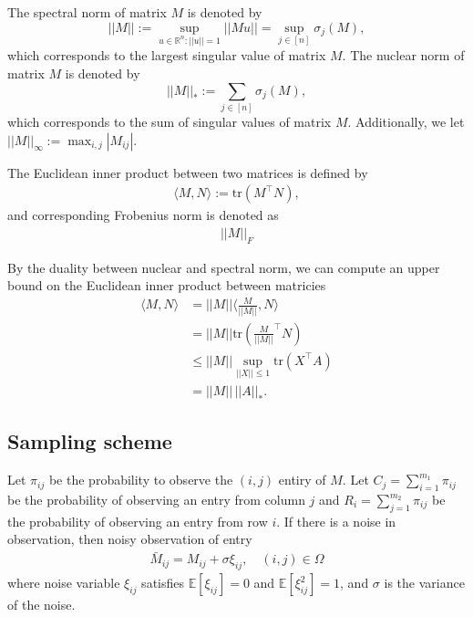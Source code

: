 \documentclass{article} %
\begin{document}
The spectral norm of matrix $M$ is denoted by
\begin{equation}
||M|| := \sup_{u\in \mathbb{R}^n:||u||=1}||Mu|| = \sup_{j\in[n]}\sigma_j(M),
\end{equation}
which corresponds to the largest singular value of matrix $M$. The nuclear norm of matrix $M$ is denoted by
\begin{equation}
||M||_* := \sum_{j\in[n]}\sigma_j(M),
\end{equation}
which corresponds to the sum of singular values of matrix $M$. Additionally, we let $||M||_\infty := \max_{i,j}|M_{ij}|$.

The Euclidean inner product between two matrices is defined by
\begin{align}
\langle M, N \rangle := \text{tr}(M^\top N),
\end{align}
and corresponding Frobenius norm is denoted as
\begin{align}
||M||_F
\end{align}

By the duality between nuclear and spectral norm, we can compute an upper bound on the Euclidean inner product between matricies
\begin{align}
\langle M, N \rangle & = ||M|| \langle \frac{M}{||M||}, N \rangle \\
& = ||M|| \text{tr}(\frac{M}{||M||}^\top N)\\
& \leq ||M|| \sup_{||X|| \leq 1} \text{tr}(X^\top A)\\
& = ||M||\,||A||_*.
\end{align}

\subsection{Sampling scheme}
Let $\pi_{ij}$ be the probability to observe the $(i,j)$ entiry of $M$. Let $C_j = \sum_{i=1}^{m_1} \pi_{ij}$ be the probability of observing an entry from column $j$ and $R_i = \sum_{j=1}^{m_2} \pi_{ij}$ be the probability of observing an entry from row $i$.
If there is a noise in observation, then noisy observation of entry
\begin{align}
\bar{M}_{ij} = M_{ij} + \sigma\xi_{ij}, \quad (i,j) \in \Omega
\end{align}
where noise variable $\xi_{ij}$ satisfies $\mathbb{E}[\xi_{ij}] = 0$ and $\mathbb{E}[\xi_{ij}^2] = 1$, and $\sigma$ is the variance of the noise.
\end{document}

